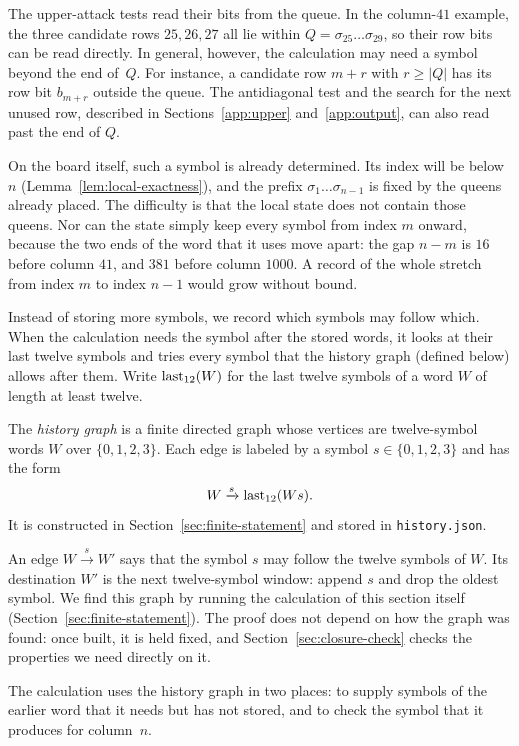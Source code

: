 The upper-attack tests read their bits from the queue. In the
column-$41$ example, the three candidate rows $25,26,27$ all lie
within $Q=\sigma_{25}\dots\sigma_{29}$, so their row bits
can be read directly. In general, however, the calculation may
need a symbol beyond the end of~$Q$. For instance, a candidate row
$m+r$ with $r\ge|Q|$ has its row bit $b_{m+r}$ outside the
queue. The antidiagonal test and the search for the next unused
row, described in Sections~\ref{app:upper} and~\ref{app:output},
can also read past the end of $Q$.

On the board itself, such a symbol is already determined. Its index
will be below $n$ (Lemma~\ref{lem:local-exactness}), and the prefix
$\sigma_1\dots\sigma_{n-1}$ is fixed by the queens already placed.
The difficulty is that the local state does not contain those queens.
Nor can the state simply keep every symbol from index $m$ onward,
because the two ends of the word that it uses move apart: the gap
$n-m$ is $16$ before column $41$, and $381$ before column $1000$.
A record of the whole stretch from index $m$ to index $n-1$ would
grow without bound.

Instead of storing more symbols, we record which symbols may follow
which. When the calculation needs the symbol after the stored words,
it looks at their last twelve symbols and tries every symbol that
the history graph (defined below) allows after them. Write $\operatorname{last}_{12}(W)$ for the
last twelve symbols of a word $W$ of length at least twelve.

\begin{definition}\label{def:history-graph}
The \emph{history graph} is a finite directed graph whose vertices
are twelve-symbol words $W$ over $\{0,1,2,3\}$. Each edge is
labeled by a symbol $s\in\{0,1,2,3\}$ and has the form
\[
 W\xrightarrow{s}\operatorname{last}_{12}(Ws).
\]
It is constructed in Section~\ref{sec:finite-statement} 
and stored in \texttt{history.json}.
\end{definition}

An edge $W\xrightarrow{s}W'$ says that the symbol $s$ may follow
the twelve symbols of $W$. Its destination $W'$ is the next
twelve-symbol window: append $s$ and drop the oldest symbol.
We find this graph by running the calculation of this section
itself (Section~\ref{sec:finite-statement}). The proof does not
depend on how the graph was found: once built, it is held fixed,
and Section~\ref{sec:closure-check} checks the properties we need
directly on it. 

The calculation uses the history graph in two places: to supply symbols
of the earlier word that it needs but has not stored, and to check
the symbol that it produces for column~$n$.

